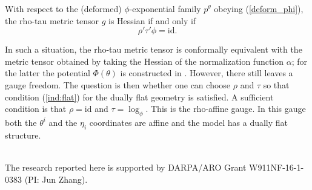 \documentclass[graybox]{svmult}
\newcommand{\id}{\mbox{id}}
\begin{document}
\begin{theorem}
With respect to the (deformed) $\phi$-exponential family $p^\theta$ obeying  (\ref{deform_phi}), the rho-tau metric tensor $g$ is Hessian if and only if 
$$
\rho'\tau'\phi=\id .
$$ 
\end{theorem}
  
In such a situation,  the rho-tau metric tensor is conformally equivalent
with the metric tensor obtained by taking the Hessian of the normalization
function $\alpha$; for the latter the potential $\Phi(\theta)$ is constructed in \cite{NJ04}. However, there still leaves a gauge freedom. The question is then whether one can choose $\rho$ and $\tau$ so that condition 
(\ref {ind:flat}) for the dually flat geometry is satisfied.
A sufficient condition is that $\rho=\id$ and $\tau=\log_\phi$. This is the rho-affine gauge. In this gauge both the $\theta^i$ and the $\eta_i$ coordinates are affine and the model has a dually flat structure.



\vspace{0.1cm}

 \\
The research reported here is supported by DARPA/ARO Grant W911NF-16-1-0383 (PI: Jun Zhang). 
\end{document}
